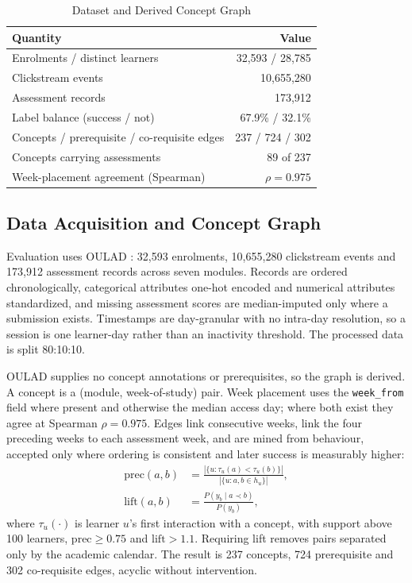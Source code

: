 \documentclass[conference]{IEEEtran}
\begin{document}
\begin{table}[t]
\centering
\caption{Dataset and Derived Concept Graph}
\label{tab:dataset}
\footnotesize
\begin{tabular}{lr}
\hline
\textbf{Quantity} & \textbf{Value} \\
\hline
Enrolments / distinct learners        & 32{,}593 / 28{,}785 \\
Clickstream events                    & 10{,}655{,}280 \\
Assessment records                    & 173{,}912 \\
Label balance (success / not)         & 67.9\% / 32.1\% \\
Concepts / prerequisite / co-requisite edges & 237 / 724 / 302 \\
Concepts carrying assessments         & 89 of 237 \\
Week-placement agreement (Spearman)   & $\rho = 0.975$ \\
\hline
\end{tabular}
\end{table}

\subsection{Data Acquisition and Concept Graph}

Evaluation uses OULAD \cite{kuzilek2017oulad}: 32{,}593 enrolments, 10{,}655{,}280
clickstream events and 173{,}912 assessment records across seven modules. Records are
ordered chronologically, categorical attributes one-hot encoded and numerical attributes
standardized, and missing assessment scores are median-imputed only where a submission
exists. Timestamps are day-granular with no intra-day resolution, so a session is one
learner-day rather than an inactivity threshold. The processed data is split 80:10:10.

OULAD supplies no concept annotations or prerequisites, so the graph is derived. A concept
is a (module, week-of-study) pair. Week placement uses the \texttt{week\_from} field where
present and otherwise the median access day; where both exist they agree at Spearman
$\rho = 0.975$. Edges link consecutive weeks, link the four preceding weeks to each
assessment week, and are mined from behaviour, accepted only where ordering is consistent
and later success is measurably higher:
\begin{equation}
\begin{split}
\mathrm{prec}(a,b) &= \frac{\left|\{u : \tau_u(a) < \tau_u(b)\}\right|}{\left|\{u : a, b \in h_u\}\right|},\\[2pt]
\mathrm{lift}(a,b) &= \frac{P(y_b \mid a \prec b)}{P(y_b)},
\end{split}
\label{eq:mining}
\end{equation}
where $\tau_u(\cdot)$ is learner $u$'s first interaction with a concept, with support above
100 learners, $\mathrm{prec} \geq 0.75$ and $\mathrm{lift} > 1.1$. Requiring lift removes
pairs separated only by the academic calendar. The result is 237 concepts, 724 prerequisite
and 302 co-requisite edges, acyclic without intervention.
\end{document}
